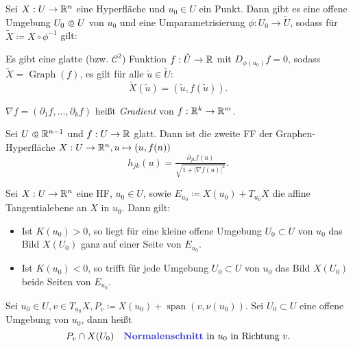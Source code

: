 \documentclass{cheat-sheet}
\DeclareMathOperator{\Graph}{Graph}
\DeclareMathOperator{\Span}{span} %
\newcommand{\Cont}{\mathcal{C}} %
\begin{document}


\begin{satz}
  Sei $X : U \to \mathbb{R}^n$ eine Hyperfläche und $u_0 \in U$ ein Punkt. Dann gibt es eine offene Umgebung $U_0 \opn U$ von $u_0$ und eine Umparametrisierung $\phi : U_0 \to \tilde{U}$, sodass für $\tilde{X} \coloneqq X \circ \phi^{-1}$ gilt:

  Es gibt eine glatte (bzw. $\Cont^2$) Funktion $f : \tilde{U} \to \mathbb{R}$ mit $D_{\phi(u_0)} f = 0$, sodass $\tilde{X} = \Graph(f)$, \dh{} es gilt für alle $\tilde{u} \in \tilde{U}$:
  \[ \tilde{X}(\tilde{u}) = (\tilde{u}, f(\tilde{u})). \]
\end{satz}

\begin{nota}
  $\nabla f = (\partial_1 f, \ldots, \partial_k f)$ heißt \emph{Gradient} von $f : \mathbb{R}^k \to \mathbb{R}^m$.
\end{nota}

\begin{satz}
  Sei $U \opn \R^{n-1}$ und $f : U \to \mathbb{R}$ glatt. Dann ist die zweite FF der Graphen-Hyperfläche $X : U \to \mathbb{R}^n, u \mapsto (u, f(n))$
  \[ h_{jk}(u) = \tfrac{\partial_{jk} f(u)}{\sqrt{1 + |\nabla f(u)|^2}}. \]
\end{satz}

\begin{satz}
  Sei $X : U \to \mathbb{R}^n$ eine HF, $u_0 \in U$, sowie $E_{u_0} \coloneqq X(u_0) + T_{u_0} X$ die affine Tangentialebene an $X$ in $u_0$. Dann gilt:
  \begin{itemize}
    \item Ist $K(u_0) > 0$, so liegt für eine kleine offene Umgebung $U_0 \subset U$ von $u_0$ das Bild $X(U_0)$ ganz auf einer Seite von $E_{u_0}$.
    \item Ist $K(u_0) < 0$, so trifft für jede Umgebung $U_0 \subset U$ von $u_0$ das Bild $X(U_0)$ beide Seiten von $E_{u_0}$.
  \end{itemize}
\end{satz}




\begin{defn}
  Sei $u_0 \in U, v \in T_{u_0} X, P_v \coloneqq X(u_0) + \Span(v, \nu(u_0))$.
  Sei $U_0 \subset U$ eine offene Umgebung von $u_0$, dann heißt
  \[
    P_v \cap X(U_0)
    \quad \text{\emph{Normalenschnitt} in $u_0$ in Richtung $v$.}
  \]
\end{defn}
\end{document}
